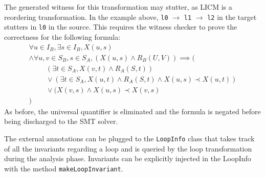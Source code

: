 The generated witness for this transformation may stutter, as LICM is a reordering transformation. In the example above, \texttt{l0} $\rightarrow$ \texttt{l1} $\rightarrow$ \texttt{l2} in the target stutters in \texttt{l0} in the source. This requires the witness checker to prove the correctness for the following formula:
\[
\begin{array}{l}
  \forall u \in I_B, \exists s \in I_B, X(u,s) \\
  \land \forall u,v \in S_B, s \in S_A, (X(u,s) \land R_B(U,V)) \implies( \\
  \hspace{1cm}(\exists t \in S_A, X(v,t) \land R_A(S,t))\\
  \hspace{1cm}\lor (\exists t \in S_A, X(u,t) \land R_A(S,t) \land X(u,s) \prec  X(u,t))\\
  \hspace{1cm}\lor (X(v,s) \land X(u,s) \prec  X(v,s)\\
  )
\end{array}
\]
As before, the universal quantifier is eliminated and the formula is negated before being discharged to the SMT solver.

The external annotations can be plugged to the \texttt{LoopInfo} class that takes track of all the invariants regarding a loop and is queried by the loop transformation during the analysis phase. Invariants can be explicitly injected in the LoopInfo with the method \texttt{makeLoopInvariant}.
